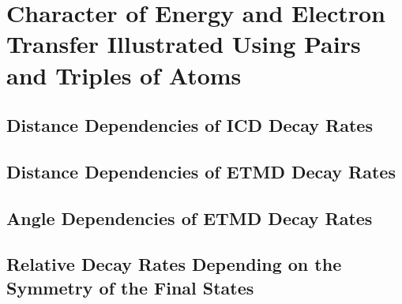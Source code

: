 \section{Character of Energy and Electron Transfer Illustrated Using Pairs and Triples of Atoms}

\subsection{Distance Dependencies of ICD Decay Rates}
\subsection{Distance Dependencies of ETMD Decay Rates}
\subsection{Angle Dependencies of ETMD Decay Rates}
\subsection{Relative Decay Rates Depending on the Symmetry of the Final States}
